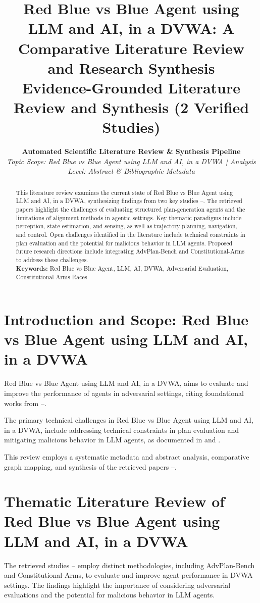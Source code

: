 \documentclass[10pt,twocolumn,letterpaper]{article}
\title{\LARGE \textbf{Red Blue vs Blue Agent using LLM and AI, in a DVWA: A Comparative Literature Review and Research Synthesis}\\[4pt]
\large Evidence-Grounded Literature Review and Synthesis (2 Verified Studies)}
\author{\textbf{Automated Scientific Literature Review \& Synthesis Pipeline}\\
\small \textit{Topic Scope: Red Blue vs Blue Agent using LLM and AI, in a DVWA | Analysis Level: Abstract \& Bibliographic Metadata}}
\date{}
\begin{document}
\maketitle

\begin{abstract}
\noindent This literature review examines the current state of Red Blue vs Blue Agent using LLM and AI, in a DVWA, synthesizing findings from two key studies \cite{ref1}–\cite{ref2}. The retrieved papers highlight the challenges of evaluating structured plan-generation agents and the limitations of alignment methods in agentic settings. Key thematic paradigms include perception, state estimation, and sensing, as well as trajectory planning, navigation, and control. Open challenges identified in the literature include technical constraints in plan evaluation and the potential for malicious behavior in LLM agents. Proposed future research directions include integrating AdvPlan-Bench and Constitutional-Arms to address these challenges.
\vspace{4pt}\\
\noindent \textbf{Keywords:} Red Blue vs Blue Agent, LLM, AI, DVWA, Adversarial Evaluation, Constitutional Arms Races
\end{abstract}

\section{Introduction and Scope: Red Blue vs Blue Agent using LLM and AI, in a DVWA}
Red Blue vs Blue Agent using LLM and AI, in a DVWA, aims to evaluate and improve the performance of agents in adversarial settings, citing foundational works from \cite{ref1}–\cite{ref2}.

The primary technical challenges in Red Blue vs Blue Agent using LLM and AI, in a DVWA, include addressing technical constraints in plan evaluation and mitigating malicious behavior in LLM agents, as documented in \cite{ref1} and \cite{ref2}.

This review employs a systematic metadata and abstract analysis, comparative graph mapping, and synthesis of the retrieved papers \cite{ref1}–\cite{ref2}.

\section{Thematic Literature Review of Red Blue vs Blue Agent using LLM and AI, in a DVWA}
The retrieved studies \cite{ref1}–\cite{ref2} employ distinct methodologies, including AdvPlan-Bench and Constitutional-Arms, to evaluate and improve agent performance in DVWA settings. The findings highlight the importance of considering adversarial evaluations and the potential for malicious behavior in LLM agents.
\end{document}
